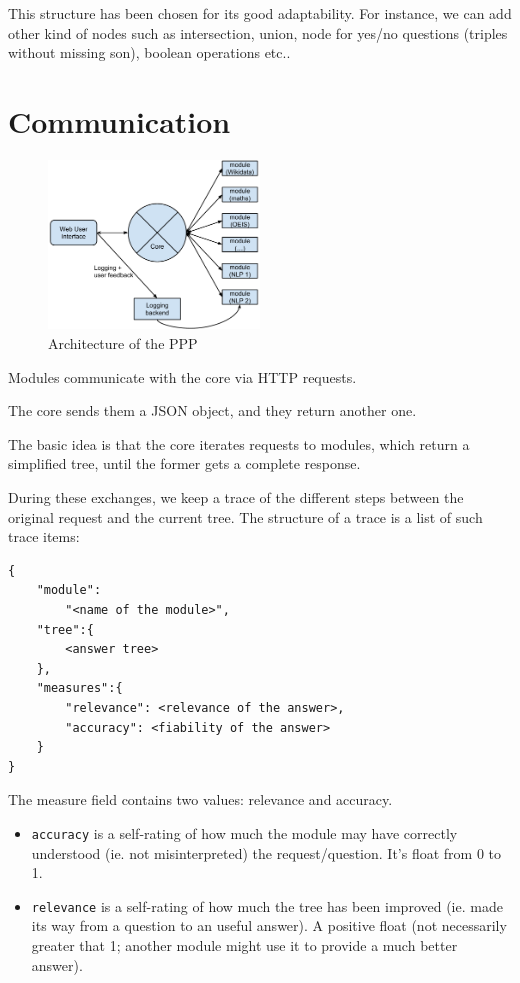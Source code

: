 This structure has been chosen for its good adaptability. For instance, we can add other kind of nodes such as intersection, union, node for yes/no questions (triples without missing son), boolean operations etc..

\section{Communication}

\begin{figure}
  \centering
    \label{struct}
    \caption{Architecture of the PPP}
    \includegraphics[width=0.5\textwidth]{../ppp_structure.pdf}
\end{figure}
Modules communicate with the core via HTTP requests.

The core sends them a JSON object, and they return another one.

The basic idea is that the core iterates requests to modules, which return a simplified tree, until the former gets a complete response.

During these exchanges, we keep a trace of the different steps between the original request and the current tree. The structure of a trace is a list of such trace items:
\begin{verbatim}
{
    "module":
        "<name of the module>", 
    "tree":{
        <answer tree>
    },
    "measures":{
        "relevance": <relevance of the answer>,
        "accuracy": <fiability of the answer>
    }
}
\end{verbatim}

The measure field contains two values: relevance and accuracy.

\begin{itemize}
    \item \texttt{accuracy} is a self-rating of how much the module may have correctly understood (ie. not misinterpreted) the request/question. It's float from 0 to 1.
    \item \texttt{relevance} is a self-rating of how much the tree has been improved (ie. made its way from a question to an useful answer). A positive float (not necessarily greater that 1; another module might use it to provide a much better answer).
\end{itemize}

